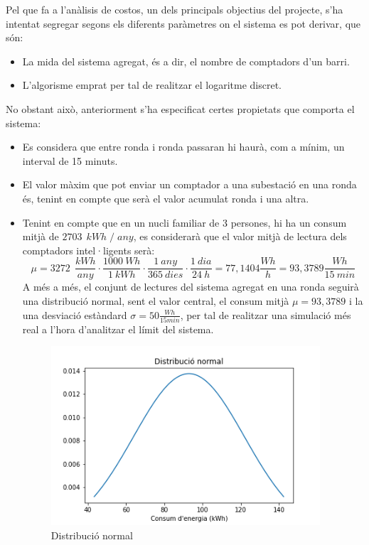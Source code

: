 
Pel que fa a l'anàlisis de costos, un dels principals objectius del projecte, s'ha intentat segregar segons els diferents paràmetres on el sistema es pot derivar, que són:
\begin{itemize}
	\item La mida del sistema agregat, és a dir, el nombre de comptadors d'un barri.
	\item L'algorisme emprat per tal de realitzar el logaritme discret.
\end{itemize}
No obstant això, anteriorment s'ha especificat certes propietats que comporta el sistema:
\begin{itemize}
	\item Es considera que entre ronda i ronda passaran hi haurà, com a mínim, un interval de 15 minuts.
	\item El valor màxim que pot enviar un comptador a una subestació en una ronda és, tenint en compte que serà el valor acumulat ronda i una altra.
\item Tenint en compte que en un nucli familiar de 3 persones, hi ha un consum mitjà de $2703 \ \ kWh \; / \; any$, es considerarà que el valor mitjà de lectura dels comptadors intel·ligents serà:
\[\mu = 3272 \ \ \frac{kWh}{any} \cdot \frac{1000 \ Wh}{1 \ kWh} \cdot \frac{1 \ any}{365 \ dies} \cdot \frac{1 \ dia}{24 \ h} = 77,1404\frac{Wh}{h} = 93,3789 \frac{Wh}{15 \ min} \]
A més a més, el conjunt de lectures del sistema agregat en una ronda seguirà una distribució normal, sent el valor central, el consum mitjà $\mu = 93,3789$ i la una desviació estàndard $\sigma = 50 \frac{Wh}{15 min}$, per tal de realitzar una simulació més real a l'hora d'analitzar el límit del sistema.
\begin{figure}[H]
	\centering
	\includegraphics[width=10cm]{imgs/cost/normal.png}
	\caption{Distribució normal}
	\label{fig:normal-dist}
\end{figure}
\end{itemize}
